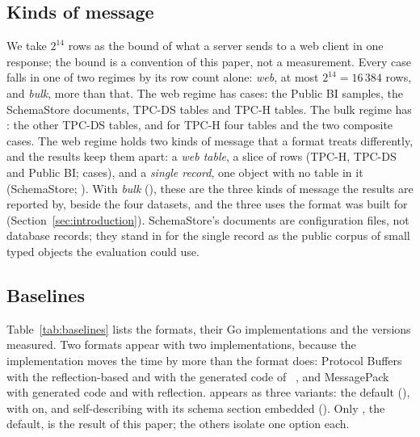\subsection{Kinds of message}
\label{sec:kinds}

We take $2^{14}$ rows as the bound of what a server sends to a web client in
one response; the bound is a convention of this paper, not a measurement.
Every case falls in one of two regimes by its row count alone:
\emph{web}, at most $2^{14} = 16\,384$ rows, and \emph{bulk}, more than that.
The web regime has  cases: the 
Public BI samples, the  SchemaStore documents,
 TPC-DS tables and  TPC-H
tables. The bulk regime has : the other
 TPC-DS tables, and for TPC-H four tables and the
two composite cases. The web regime holds two kinds of message that a
format treats differently, and the results keep them apart: a \emph{web
table}, a slice of rows (TPC-H, TPC-DS and Public BI;
 cases), and a \emph{single record}, one
object with no table in it (SchemaStore;
). With \emph{bulk}
(), these are the three kinds of message the
results are reported by, beside the four datasets, and the three uses the
format was built for (Section~\ref{sec:introduction}). SchemaStore's
documents are configuration files, not database records; they stand in for
the single record as the public corpus of small typed objects the
evaluation could use.

\subsection{Baselines}

Table~\ref{tab:baselines} lists the formats, their Go implementations and the
versions measured. Two formats appear with two implementations, because the
implementation moves the time by more than the format does: Protocol Buffers
with the reflection-based  and with the generated code of
~\cite{vtprotobuf}, and MessagePack with generated code and
with reflection. \colbin{} appears as three variants: the default
(), with  on, and self-describing with its schema
section embedded (). Only , the default, is the result of this
paper; the others isolate one option each.

